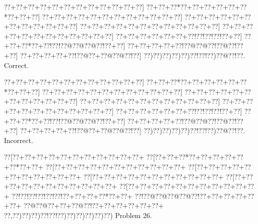 \documentclass[a5paper]{article}
\begin{document}
\begin{center}
{\goo
\0??+\0??+\0??+\0??+\0??+\0??+\0??+\0??+\0??+\0??+\0??+\0??]
\0??+\0??+\0??*\0??+\0??+\0??+\0??+\0??+\0??*\0??+\0??+\0??]
\0??+\0??+\0??+\0??+\0??+\0??+\0??+\0??+\0??+\0??+\0??+\0??]
\0??+\0??+\0??+\0??+\0??+\0??+\0??+\0??+\0??+\0??+\0??+\0??]
\0??+\0??+\0??+\0??+\0??+\0??+\0??+\0??+\0??+\0??+\0??+\0??]
\0??+\0??+\0??+\0??+\0??+\0??+\0??+\0??+\0??+\0??+\0??+\0??]
\0??+\0??+\0??+\0??+\0??+\0??+\0??!\0??!\0??!\0??!\0??+\0??]
\0??+\0??+\0??*\0??+\0??!\0??!\0??@\0??@\0??@\0??!\0??+\0??]
\0??+\0??+\0??+\0??+\0??!\0??@\0??@\0??!\0??@\0??!\0??+\0??]
\0??+\0??+\0??+\0??+\0??!\0??@\0??+\0??@\0??@\0??!\0??]
\0??)\0??)\0??)\0??)\0??)\0??!\0??!\0??)\0??@\0??!\0??.
}
Correct. 

\end{center}
\begin{center}
{\goo
\0??+\0??+\0??+\0??+\0??+\0??+\0??+\0??+\0??+\0??+\0??+\0??]
\0??+\0??+\0??*\0??+\0??+\0??+\0??+\0??+\0??*\0??+\0??+\0??]
\0??+\0??+\0??+\0??+\0??+\0??+\0??+\0??+\0??+\0??+\0??+\0??]
\0??+\0??+\0??+\0??+\0??+\0??+\0??+\0??+\0??+\0??+\0??+\0??]
\0??+\0??+\0??+\0??+\0??+\0??+\0??+\0??+\0??+\0??+\0??+\0??]
\0??+\0??+\0??+\0??+\0??+\0??+\0??+\0??+\0??+\0??+\0??+\0??]
\0??+\0??+\0??+\0??+\0??+\0??+\0??!\0??!\0??!\0??!\0??+\0??]
\0??+\0??+\0??*\0??+\0??!\0??!\0??@\0??@\0??@\0??!\0??+\0??]
\0??+\0??+\0??+\0??+\0??!\0??@\0??@\0??!\0??@\0??!\0??+\0??]
\0??+\0??+\0??+\0??+\0??!\0??@\0??+\0??@\0??@\0??!\0??]
\0??)\0??)\0??)\0??)\0??)\0??!\0??!\0??)\0??@\0??!\0??.
}
Incorrect. 

\end{center}
\newpage
\begin{center}
{\goo
\0??[\0??+\0??+\0??+\0??+\0??+\0??+\0??+\0??+\0??+\0??+\0??+
\0??[\0??+\0??+\0??*\0??+\0??+\0??+\0??+\0??+\0??*\0??+\0??+
\0??[\0??+\0??+\0??+\0??+\0??+\0??+\0??+\0??+\0??+\0??+\0??+
\0??[\0??+\0??+\0??+\0??+\0??+\0??+\0??+\0??+\0??+\0??+\0??+
\0??[\0??+\0??+\0??+\0??+\0??+\0??+\0??+\0??+\0??+\0??+\0??+
\0??[\0??+\0??+\0??+\0??+\0??+\0??+\0??+\0??+\0??+\0??+\0??+
\0??[\0??+\0??+\0??+\0??+\0??+\0??+\0??+\0??+\0??+\0??+\0??+
\0??!\0??!\0??!\0??!\0??!\0??!\0??+\0??+\0??+\0??*\0??+\0??+
\0??!\0??@\0??@\0??@\0??@\0??!\0??+\0??+\0??+\0??+\0??+\0??+
\0??@\0??@\0??+\0??+\0??@\0??!\0??+\0??+\0??+\0??+\0??+\0??+
\0??,\0??)\0??)\0??)\0??!\0??!\0??)\0??)\0??)\0??)\0??)\0??)
}
Problem 26.

\end{center}
\end{document}
